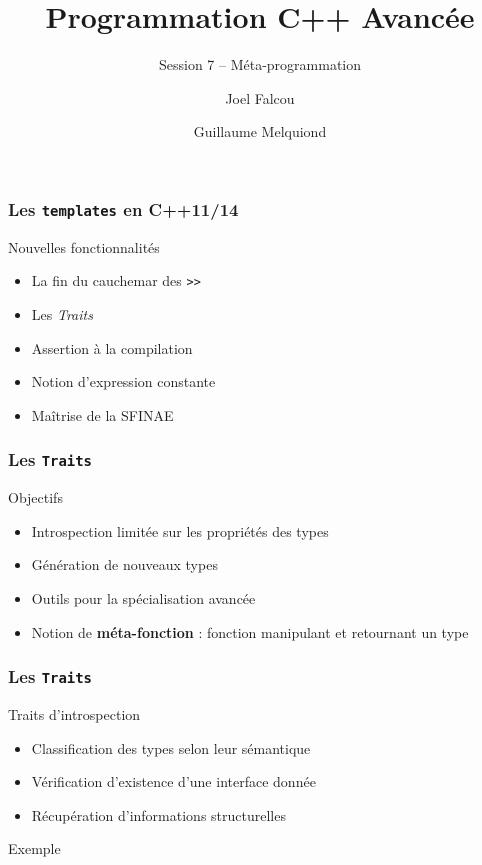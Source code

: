 \documentclass[svgnames]{beamer}
\title{Programmation C++ Avancée}
\subtitle{Session 7 -- Méta-programmation}
\author{Joel Falcou \and Guillaume Melquiond}
\institute{Laboratoire de Recherche en Informatique}
\date{}
\begin{document}



\begin{frame}[plain]
\titlepage
\end{frame}
\setcounter{framenumber}{0}

\frame
{
  \frametitle{Les \texttt{templates} en C++11/14}

  \begin{block}{Nouvelles fonctionnalités}
  \begin{itemize}
  \item La fin du cauchemar des \texttt{>>}
  \item Les \textit{Traits}
  \item Assertion \`a la compilation
  \item Notion d'expression constante
  \item Maîtrise de la SFINAE
  \end{itemize}
  \end{block}
}

\frame
{
  \frametitle{Les \texttt{Traits}}

  \begin{block}{Objectifs}
  \begin{itemize}
  \item Introspection limitée sur les propriétés des types
  \item Génération de nouveaux types
  \item Outils pour la spécialisation avancée
  \item Notion de \textbf{méta-fonction} : fonction manipulant et retournant un type
  \end{itemize}
  \end{block}
}

\frame
{
  \frametitle{Les \texttt{Traits}}

  \begin{block}{Traits d'introspection}
  \begin{itemize}
  \item Classification des types selon leur sémantique
  \item Vérification d'existence d'une interface donnée
  \item Récupération d'informations structurelles
  \end{itemize}
  \end{block}

  \begin{block}{Exemple}
  \medskip
  \end{block}
}
\end{document}
